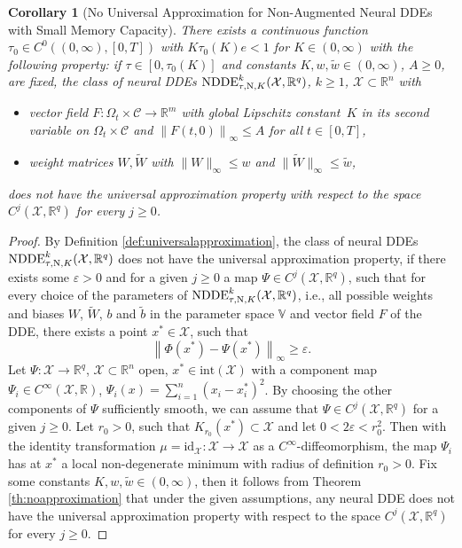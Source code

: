 \documentclass[10pt]{article}
\numberwithin{equation}{section}
\newtheorem{corollary}[theorem]{Corollary}
\newcommand{\eps}{\varepsilon}
\newcommand\norm[1]{\left\lVert#1\right\rVert}
\newcommand\normm[1]{\big\lVert#1\big\lVert}
\begin{document}
	\begin{corollary}[No Universal Approximation for Non-Augmented Neural DDEs with Small Memory Capacity] \label{cor:noapproximation}
		There exists a continuous function $\tau_0\in C^0((0,\infty),[0,T])$ with $K \tau_0(K) e<1$ for $K\in(0,\infty)$ with the following property: if $\tau \in [0,\tau_0(K)]$ and constants $K,w,\tilde w\in (0,\infty)$, $A\geq 0$, are fixed, the class of neural DDEs $\textup{NDDE}_{\tau,\textup{N},K}^k(\mathcal{X},\mathbb{R}^q)$, $k \geq 1$, $\mathcal{X}\subset \mathbb{R}^n$ with
		\begin{itemize}
			\item  vector field $F:\Omega_t \times \mathcal{C} \rightarrow \mathbb{R}^m$ with global Lipschitz constant~$K$ in its second variable on $\Omega_t \times \mathcal{C}$ and $\norm{F(t,0)}_\infty \leq A$ for all $t\in [0,T]$,
			\item weight matrices $W, \widetilde{W}$ with $\normm{W}_\infty \leq w$ and $\normm{\widetilde{W}}_\infty \leq\tilde{w}$,
		\end{itemize}
		does not have the universal approximation property with respect to the space  $C^j(\mathcal{X},\mathbb{R}^q)$ for every $j\geq 0$. 
	\end{corollary}
	
	\begin{proof}
		By Definition \ref{def:universalapproximation}, the class of neural DDEs $\textup{NDDE}_{\tau,\textup{N},K}^k(\mathcal{X},\mathbb{R}^q)$ does not have the universal approximation property, if there exists some $\eps>0$ and for a given $j \geq 0$ a map $\Psi\in C^j(\mathcal{X},\mathbb{R}^q)$, such that for every choice of the parameters of $\textup{NDDE}_{\tau,\textup{N},K}^k(\mathcal{X},\mathbb{R}^q)$, i.e., all possible weights and biases $W$, $\widetilde{W}$, $b$ and $\tilde{b}$ in the parameter space $\mathbb{V}$ and vector field $F$ of the DDE, there exists a point $x^\ast \in \mathcal{X}$, such that  
		\begin{equation*}
			\norm{\Phi(x^\ast)-\Psi(x^\ast)}_\infty\geq\eps.
		\end{equation*} 
		Let $\Psi:\mathcal{X}\rightarrow \mathbb{R}^q$,  $\mathcal{X}\subset \mathbb{R}^n$ open, $x^\ast \in \text{int}(\mathcal{X})$ with a component map $\Psi_i\in C^\infty(\mathcal{X}, \mathbb{R})$,  $\Psi_i(x) = \sum_{i = 1}^n (x_i-x_i^\ast)^2$. By choosing the other components of $\Psi$ sufficiently smooth, we can assume that $\Psi\in C^j(\mathcal{X},\mathbb{R}^q)$ for a given $j\geq 0$. Let $r_0>0$, such that $K_{r_0}(x^\ast)\subset \mathcal{X}$ and let $0<2\eps<r_0^2$. Then with the identity transformation $\mu = \text{id}_\mathcal{X}:\mathcal{X}\rightarrow \mathcal{X}$ as a $C^\infty$-diffeomorphism, the map $\Psi_i$ has at $x^\ast$ a local non-degenerate minimum with radius of definition $r_0>0$. Fix some constants $K, w,\tilde{w} \in (0,\infty)$, then it follows from Theorem \ref{th:noapproximation} that under the given assumptions, any neural DDE does not have the universal approximation property with respect to the space  $C^j(\mathcal{X},\mathbb{R}^q)$ for every $j\geq 0$. 
	\end{proof}
	
\end{document}
